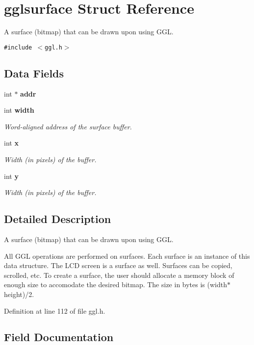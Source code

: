 \section{gglsurface Struct Reference}
\label{structgglsurface}
A surface (bitmap) that can be drawn upon using GGL.  


{\tt \#include $<$ggl.h$>$}

\subsection*{Data Fields}
\begin{CompactItemize}
\item 
int $\ast$ {\bf addr}
\item 
int {\bf width}
\begin{CompactList}\small\item\em Word-aligned address of the surface buffer. \item\end{CompactList}\item 
int {\bf x}
\begin{CompactList}\small\item\em Width (in pixels) of the buffer. \item\end{CompactList}\item 
int {\bf y}
\begin{CompactList}\small\item\em Width (in pixels) of the buffer. \item\end{CompactList}\end{CompactItemize}


\subsection{Detailed Description}
A surface (bitmap) that can be drawn upon using GGL. 

All GGL operations are performed on surfaces. Each surface is an instance of this data structure. The LCD screen is a surface as well. Surfaces can be copied, scrolled, etc. To create a surface, the user should allocate a memory block of enough size to accomodate the desired bitmap. The size in bytes is (width$\ast$height)/2. 



Definition at line 112 of file ggl.h.

\subsection{Field Documentation}
